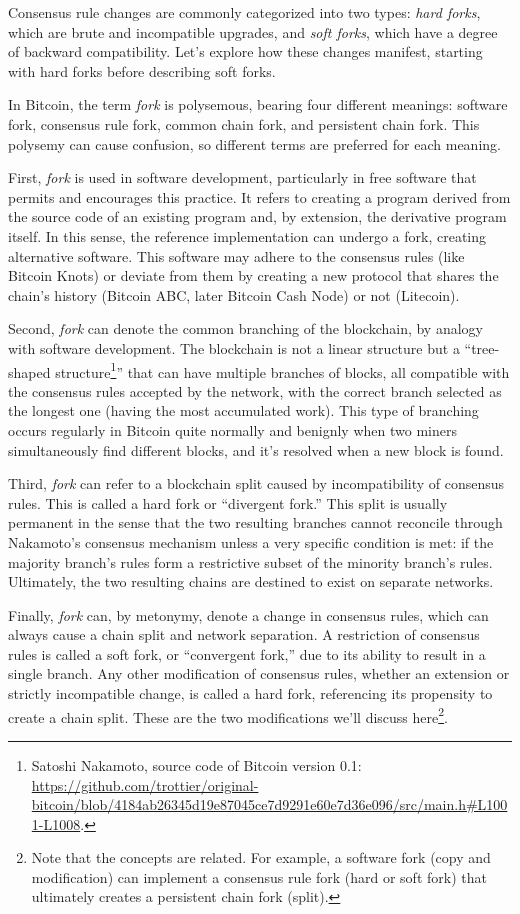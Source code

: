 \documentclass[
  a5paper,
  smalldemyvopaper,10pt,twoside,onecolumn,openright,extrafontsizes,hidelinks]{memoir}
\begin{document}
Consensus rule changes are commonly categorized into two types:
\emph{hard forks}, which are brute and incompatible upgrades, and
\emph{soft forks}, which have a degree of backward compatibility. Let's
explore how these changes manifest, starting with hard forks before
describing soft forks.

In Bitcoin, the term \emph{fork} is polysemous, bearing four different
meanings: software fork, consensus rule fork, common chain fork, and
persistent chain fork. This polysemy can cause confusion, so different
terms are preferred for each meaning.

First, \emph{fork} is used in software development, particularly in free
software that permits and encourages this practice. It refers to
creating a program derived from the source code of an existing program
and, by extension, the derivative program itself. In this sense, the
reference implementation can undergo a fork, creating alternative
software. This software may adhere to the consensus rules (like Bitcoin
Knots) or deviate from them by creating a new protocol that shares the
chain's history (Bitcoin ABC, later Bitcoin Cash Node) or not
(Litecoin).

Second, \emph{fork} can denote the common branching of the blockchain,
by analogy with software development. The blockchain is not a linear
structure but a ``tree-shaped structure\footnote{Satoshi Nakamoto,
  source code of Bitcoin version 0.1:
  \url{https://github.com/trottier/original-bitcoin/blob/4184ab26345d19e87045ce7d9291e60e7d36e096/src/main.h\#L1001-L1008}.}''
that can have multiple branches of blocks, all compatible with the
consensus rules accepted by the network, with the correct branch
selected as the longest one (having the most accumulated work). This
type of branching occurs regularly in Bitcoin quite normally and
benignly when two miners simultaneously find different blocks, and it's
resolved when a new block is found.

Third, \emph{fork} can refer to a blockchain split caused by
incompatibility of consensus rules. This is called a hard fork or
``divergent fork.'' This split is usually permanent in the sense that
the two resulting branches cannot reconcile through Nakamoto's consensus
mechanism unless a very specific condition is met: if the majority
branch's rules form a restrictive subset of the minority branch's rules.
Ultimately, the two resulting chains are destined to exist on separate
networks.

Finally, \emph{fork} can, by metonymy, denote a change in consensus
rules, which can always cause a chain split and network separation. A
restriction of consensus rules is called a soft fork, or ``convergent
fork,'' due to its ability to result in a single branch. Any other
modification of consensus rules, whether an extension or strictly
incompatible change, is called a hard fork, referencing its propensity
to create a chain split. These are the two modifications we'll discuss
here\footnote{Note that the concepts are related. For example, a
  software fork (copy and modification) can implement a consensus rule
  fork (hard or soft fork) that ultimately creates a persistent chain
  fork (split).}.
\end{document}
